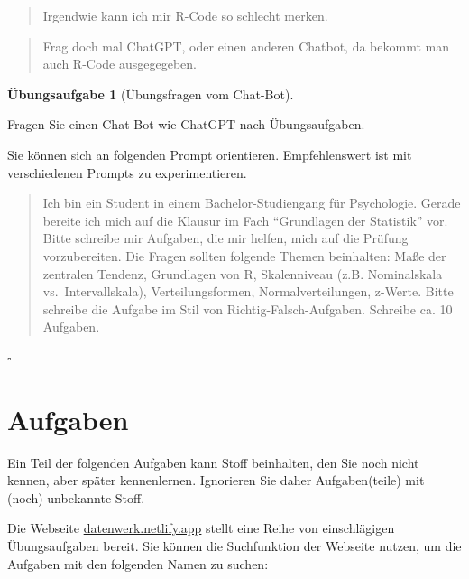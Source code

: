 \documentclass[
  a4paper,
]{scrbook}
\theoremstyle{definition}
\theoremstyle{definition}
\theoremstyle{definition}
\newtheorem{exercise}{Übungsaufgabe}[chapter]
\theoremstyle{remark}
\begin{document}
\begin{quote}
{} Irgendwie kann ich mir R-Code so schlecht merken.
\end{quote}

\begin{quote}
{} Frag doch mal ChatGPT, oder einen anderen Chatbot, da
bekommt man auch R-Code ausgegegeben.
\end{quote}

\begin{exercise}[Übungsfragen vom
Chat-Bot]\protect\hypertarget{exr-chatgpt}{}\label{exr-chatgpt}

Fragen Sie einen Chat-Bot wie ChatGPT nach Übungsaufgaben.

Sie können sich an folgenden Prompt orientieren. Empfehlenswert ist mit
verschiedenen Prompts zu experimentieren.

\begin{quote}
{} Ich bin ein Student in einem Bachelor-Studiengang für
Psychologie. Gerade bereite ich mich auf die Klausur im Fach
``Grundlagen der Statistik'' vor. Bitte schreibe mir Aufgaben, die mir
helfen, mich auf die Prüfung vorzubereiten. Die Fragen sollten folgende
Themen beinhalten: Maße der zentralen Tendenz, Grundlagen von R,
Skalenniveau (z.B. Nominalskala vs.~Intervallskala), Verteilungsformen,
Normalverteilungen, z-Werte. Bitte schreibe die Aufgabe im Stil von
Richtig-Falsch-Aufgaben. Schreibe ca. 10 Aufgaben.
\end{quote}

\(\square\)

\end{exercise}

\section{Aufgaben}\label{aufgaben-4}

Ein Teil der folgenden Aufgaben kann Stoff beinhalten, den Sie noch
nicht kennen, aber später kennenlernen. Ignorieren Sie daher
Aufgaben(teile) mit (noch) unbekannte Stoff.

Die Webseite \href{https://datenwerk.netlify.app}{datenwerk.netlify.app}
stellt eine Reihe von einschlägigen Übungsaufgaben bereit. Sie können
die Suchfunktion der Webseite nutzen, um die Aufgaben mit den folgenden
Namen zu suchen:
\end{document}
